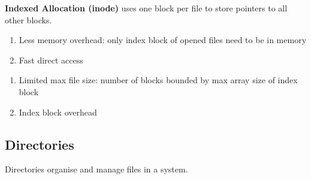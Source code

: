 \documentclass[12pt, a4paper]{article}
\begin{document}
\begin{multicols*}{3}
\textbf{Indexed Allocation (inode)} uses one block per file to store pointers to all other blocks.
\begin{enumerate}[$+$]
  \item Less memory overhead: only index block of opened files need to be in memory 
  \item Fast direct access
\end{enumerate}\vspace{-1pt}
\begin{enumerate}[$-$]
  \item Limited max file size: number of blocks bounded by max array size of index block 
  \item Index block overhead
\end{enumerate}
\vspace{-1em}
\colbreak
\subsection{Directories}
Directories organise and manage files in a system.


\end{multicols*}
\end{document}
